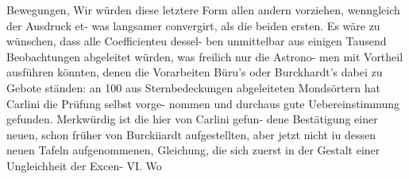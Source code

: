 \documentclass[12pt,a4paper]{article}
\begin{document}
Bewegungen, Wir würden diese letztere Form allen andern vorziehen, wenngleich der Ausdruck et-\newline
was langsamer convergirt, als die beiden ersten. Es wäre zu wünschen, dass alle Coefficienteu dessel-\newline
ben unmittelbar aus einigen Tausend Beobachtungen abgeleitet würden, was freilich nur die Astrono-\newline
men mit Vortheil ausführen könnten, denen die Vorarbeiten Büru's oder Burckhardt's dabei zu Gebote\newline
ständen: an 100 aus Sternbedeckungen abgeleiteten Mondsörtern hat Carlini die Prüfung selbst vorge-\newline
nommen und durchaus gute Uebereinstimmung gefunden. Merkwürdig ist die hier von Carlini gefun-\newline
dene Bestätigung einer neuen, schon früher von Burckiiardt aufgestellten, aber jetzt nicht iu dessen\newline
neuen Tafeln aufgenommenen, Gleichung, die sich zuerst in der Gestalt einer Ungleichheit der Excen-\newline
VI.\newline
Wo\newline
\end{document}
